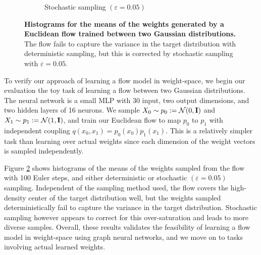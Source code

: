 \begin{figure}[h!]
\begin{subfigure}{0.47\linewidth}
        \caption{Stochastic sampling $(\varepsilon = 0.05)$}
        \label{fig:gaussian_stochastic}
    \end{subfigure}
    \caption{\label{fig:gaussian-results}\textbf{Histograms for the means of the weights generated by a Euclidean flow trained between two Gaussian distributions.} The flow fails to capture the variance in the target distribution with deterministic sampling, but this is corrected by stochastic sampling with $\varepsilon = 0.05$.} 
\end{figure}

To verify our approach of learning a flow model in weight-space, we begin our evaluation the toy task of learning a flow between two Gaussian distributions. The neural network is a small MLP with 30 input, two output dimensions, and two hidden layers of 16 neurons. We sample $X_0 \sim p_0 := \mathcal{N}(0, \mathbf{I})$ and $X_1 \sim p_1 := \mathcal{N}(1, \mathbf{I})$, and train our Euclidean flow to map $p_0$ to $p_1$ with independent coupling $q(x_0, x_1) = p_0(x_0)p_1(x_1)$. This is a relatively simpler task than learning over actual weights since each dimension of the weight vectors is sampled independently. 

Figure \ref{fig:gaussian-results} shows histograms of the means of the weights sampled from the flow with 100 Euler steps, and either deterministic or stochastic $(\varepsilon=0.05)$ sampling. Independent of the sampling method used, the flow covers the high-density center of the target distribution well, but the weights sampled deterministically fail to capture the variance in the target distribution. Stochastic sampling however appears to correct for this over-saturation and leads to more diverse samples. Overall, these results validates the feasibility of learning a flow model in weight-space using graph neural networks, and we move on to tasks involving actual learned weights. 

